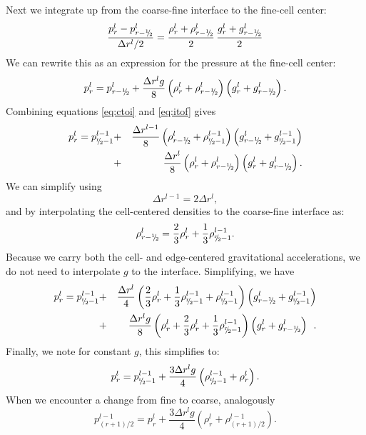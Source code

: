 Next we integrate up from the coarse-fine interface to the fine-cell center:
\begin{equation}
\frac{p_r^l - p_{r-\myhalf}^l}{\Delta r^l/2} = 
  \frac{\rho_r^l + \rho_{r-\myhalf}^l}{2} \,
  \frac{g_r^l + g_{r-\myhalf}^l}{2}
\end{equation}
We can rewrite this as an expression for the pressure at the fine-cell center:
\begin{equation}
p_r^l = p_{r-\myhalf}^l + \frac{\Delta r^l g}{8}
  \left(\rho_r^l + \rho_{r-\myhalf}^l\right)
  \left(g_r^l + g_{r-\myhalf}^l\right).
  \label{eq:itof}
\end{equation}
Combining equations \ref{eq:ctoi} and \ref{eq:itof} gives
\begin{eqnarray}
p_r^l = p_{\sfrac{r}{2}-1}^{l-1} &+& 
     \frac{\Delta r^{l-1}}{8} \left(\rho_{r-\myhalf}^l + \rho_{\sfrac{r}{2}-1}^{l-1}\right)
                                \left(   g_{r-\myhalf}^l +    g_{\sfrac{r}{2}-1}^{l-1}\right) \nonumber \\
 &+& \frac{\Delta r^l}{8} \left(\rho_r^l + \rho_{r-\myhalf}^l\right)
                            \left(   g_r^l +    g_{r-\myhalf}^l\right).
\end{eqnarray}
We can simplify using
\begin{equation}
\Delta r^{l-1} = 2\Delta r^l,
\end{equation}
and by interpolating the cell-centered densities to the coarse-fine interface as:
\begin{equation}
\rho_{r-\myhalf}^l = \frac{2}{3}\rho_r^l + \frac{1}{3}\rho_{\sfrac{r}{2}-1}^{l-1}.
\end{equation}
Because we carry both the cell- and edge-centered gravitational accelerations, we
do not need to interpolate $g$ to the interface.
Simplifying, we have
\begin{eqnarray}
p_r^l = p_{\sfrac{r}{2}-1}^{l-1} &+& 
   \frac{\Delta r^l}{4}\left(\frac{2}{3}\rho_r^l + 
                             \frac{1}{3}\rho_{\sfrac{r}{2}-1}^{l-1} + 
                             \rho_{\sfrac{r}{2}-1}^{l-1}\right) 
                       \left(   g_{r-\myhalf}^l +    g_{\sfrac{r}{2}-1}^{l-1}\right) \nonumber \\
  &+& \frac{\Delta r^l g}{8}\left(\rho_r^l + 
                                  \frac{2}{3}\rho_r^l + 
                                  \frac{1}{3}\rho_{\sfrac{r}{2}-1}^{l-1}\right) 
                       \left(   g_r^l +    g_{r-\myhalf}^l\right) \enskip .
\end{eqnarray}
Finally, we note for constant $g$, this simplifies to:
\begin{equation}
p_r^l = p_{\sfrac{r}{2}-1}^{l-1} + 
  \frac{3\Delta r^l g}{4}\left(\rho_{\sfrac{r}{2}-1}^{l-1} + \rho_r^l\right).\label{Coarse-Fine Stencil}
\end{equation}
When we encounter a change from fine to coarse, analogously
\begin{equation}
p_{(r+1)/2}^{l-1} = p_{r}^l + \frac{3\Delta r^l g}{4}\left(\rho_{r}^l+\rho_{(r+1)/2}^{l-1}\right).\label{Fine-Coarse Stencil}
\end{equation}

